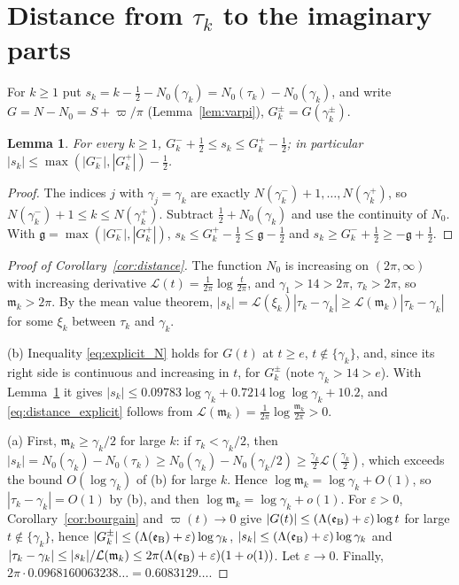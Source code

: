 \documentclass[11pt,a4paper]{article}
\makeatletter
\numberwithin{equation}{section}
\DeclareRobustCommand{\CGref}[1]{\ref{#1}}
\DeclareRobustCommand{\CGeqref}[1]{\eqref{#1}}
\let\CG@origref\ref
\let\CG@origeqref\eqref
\newcommand{\CG@gettip}[1]{\@ifundefined{CGTip@#1}{#1}{\csname CGTip@#1\endcsname}}
\DeclareRobustCommand{\CGref}[1]{\pdftooltip{\CG@origref{#1}}{\CG@gettip{#1}}}
\DeclareRobustCommand{\CGeqref}[1]{\pdftooltip{\CG@origeqref{#1}}{\CG@gettip{#1}}}
\newtheorem{lemma}[theorem]{Lemma}
\theoremstyle{definition}
\theoremstyle{remark}
\newcommand{\Nz}{N_0} %
\newcommand{\lL}{\mathcal L}
\newcommand{\eB}{\mathfrak e_{\rm B}}
\makeatother
\begin{document}
\section{Distance from \texorpdfstring{$\tau_k$}{tau_k} to the imaginary parts}\label{sec:distance}

For $k\ge1$ put $s_k=k-\frac12-\Nz(\gamma_k)=\Nz(\tau_k)-\Nz(\gamma_k)$, and write $G=N-\Nz=S+\varpi/\pi$ (Lemma~\CGref{lem:varpi}), $G_k^\pm=G(\gamma_k^\pm)$.

\begin{lemma}\label{lem:s_bounds}
For every $k\ge1$, $G_k^-+\frac12\le s_k\le G_k^+-\frac12$; in particular $|s_k|\le\max(|G_k^-|,|G_k^+|)-\frac12$.
\end{lemma}

\begin{proof}
The indices $j$ with $\gamma_j=\gamma_k$ are exactly $N(\gamma_k^-)+1,\dots,N(\gamma_k^+)$, so $N(\gamma_k^-)+1\le k\le N(\gamma_k^+)$. Subtract $\frac12+\Nz(\gamma_k)$ and use the continuity of $\Nz$. With $\mathfrak g=\max(|G_k^-|,|G_k^+|)$, $s_k\le G_k^+-\frac12\le\mathfrak g-\frac12$ and $s_k\ge G_k^-+\frac12\ge-\mathfrak g+\frac12$.
\end{proof}

\begin{proof}[Proof of Corollary~\ref{cor:distance}]
The function $\Nz$ is increasing on $(2\pi,\infty)$ with increasing derivative $\lL(t)=\frac1{2\pi}\log\frac t{2\pi}$, and $\gamma_1>14>2\pi$, $\tau_k>2\pi$, so $\mathfrak m_k>2\pi$. By the mean value theorem, $|s_k|=\lL(\xi_k)|\tau_k-\gamma_k|\ge\lL(\mathfrak m_k)|\tau_k-\gamma_k|$ for some $\xi_k$ between $\tau_k$ and $\gamma_k$.

(b) Inequality \CGeqref{eq:explicit_N} holds for $G(t)$ at $t\ge e$, $t\notin\{\gamma_k\}$, and, since its right side is continuous and increasing in $t$, for $G_k^\pm$ (note $\gamma_k>14>e$). With Lemma~\CGref{lem:s_bounds} it gives $|s_k|\le0.09783\log\gamma_k+0.7214\log\log\gamma_k+10.2$, and \CGeqref{eq:distance_explicit} follows from $\lL(\mathfrak m_k)=\frac1{2\pi}\log\frac{\mathfrak m_k}{2\pi}>0$.

(a) First, $\mathfrak m_k\ge\gamma_k/2$ for large $k$: if $\tau_k<\gamma_k/2$, then $|s_k|=\Nz(\gamma_k)-\Nz(\tau_k)\ge\Nz(\gamma_k)-\Nz(\gamma_k/2)\ge\frac{\gamma_k}2\lL(\frac{\gamma_k}2)$, which exceeds the bound $O(\log\gamma_k)$ of (b) for large $k$. Hence $\log\mathfrak m_k=\log\gamma_k+O(1)$, so $|\tau_k-\gamma_k|=O(1)$ by (b), and then $\log\mathfrak m_k=\log\gamma_k+o(1)$. For $\varepsilon>0$, Corollary~\CGref{cor:bourgain} and $\varpi(t)\to0$ give $|G(t)|\le(\Lambda(\eB)+\varepsilon)\log t$ for large $t\notin\{\gamma_k\}$, hence $|G_k^\pm|\le(\Lambda(\eB)+\varepsilon)\log\gamma_k$, $|s_k|\le(\Lambda(\eB)+\varepsilon)\log\gamma_k$ and $|\tau_k-\gamma_k|\le|s_k|/\lL(\mathfrak m_k)\le2\pi(\Lambda(\eB)+\varepsilon)(1+o(1))$. Let $\varepsilon\to0$. Finally, $2\pi\cdot0.0968160063238\ldots=0.6083129\ldots$.
\end{proof}
\end{document}
